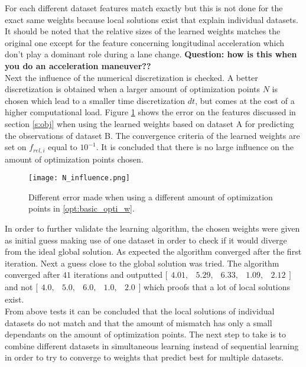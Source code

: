  For each different dataset features match exactly but this is not done for the exact same weights because local solutions exist that explain individual datasets. It should be noted that the relative sizes of the learned weights matches the original one except for the feature concerning longitudinal acceleration which don't play a dominant role during a lane change. \textbf{Question: how is this when you do an acceleration maneuver??}\\
 
 Next the influence of the numerical discretization is checked. A better discretization is obtained when a larger amount of optimization points $N$ is chosen which lead to a smaller time discretization $dt$, but comes at the cost of a higher computational load. Figure \ref{fig:N_influence} shows the error on the features discussed in section \ref{s:obj} when using the learned weights based on dataset A for predicting the observations of dataset B. The convergence criteria of the learned weights are set on $f_{rel,i}$ equal to $10^{-1}$. It is concluded that there is no large influence on the amount of optimization points chosen.\\
 
 \begin{figure}[h!]
 	\centering
 	\texttt{[image: N\_influence.png]}
 	\caption{Different error made when using a different amount of optimization points in \ref{opt:basic_opti_w}.}
 	\label{fig:N_influence}
 \end{figure}
 
 In order to further validate the learning algorithm, the chosen weights were given as initial guess making use of one dataset in order to check if it would diverge from the ideal global solution. As expected the algorithm converged after the first iteration. Next a guess close to the global solution was tried. The algorithm converged after $41$ iterations and outputted $\bigl[ \begin{smallmatrix} 4.01,&5.29,&6.33,&1.09,&2.12\end{smallmatrix}\bigr]$ and not $\bigl[ \begin{smallmatrix} 4.0,&5.0,&6.0,&1.0,&2.0\end{smallmatrix}\bigr]$ which proofs that a lot of local solutions exist.\\  
 
 From above tests it can be concluded that the local solutions of individual datasets do not match and that the amount of mismatch has only a small dependants on the amount of optimization points. The next step to take is to combine different datasets in simultaneous learning instead of sequential learning in order to try to converge to weights that predict best for multiple datasets. 
 
